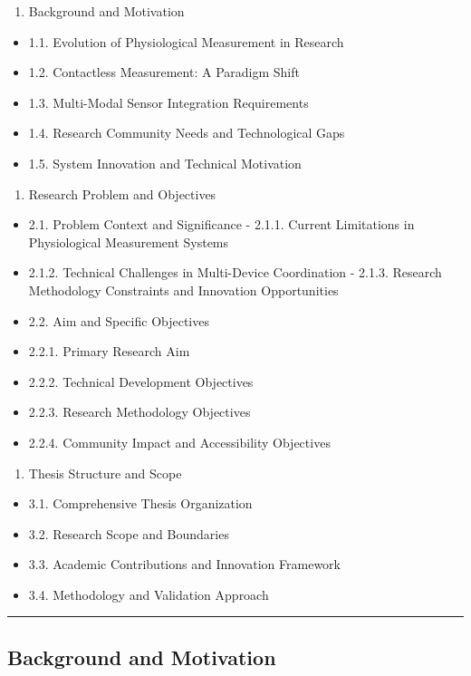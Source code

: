 \documentclass[12pt,a4paper]{report}
\begin{document}
\begin{enumerate}
\item Background and Motivation
\end{enumerate}
\begin{itemize}
\item 1.1. Evolution of Physiological Measurement in Research
\item 1.2. Contactless Measurement: A Paradigm Shift
\item 1.3. Multi-Modal Sensor Integration Requirements
\item 1.4. Research Community Needs and Technological Gaps
\item 1.5. System Innovation and Technical Motivation
\end{itemize}
\begin{enumerate}
\item Research Problem and Objectives
\end{enumerate}
\begin{itemize}
\item 2.1. Problem Context and Significance
        -
        2.1.1. Current Limitations in Physiological Measurement Systems
\item 2.1.2. Technical Challenges in Multi-Device Coordination
        -
        2.1.3. Research Methodology Constraints and Innovation Opportunities
\item 2.2. Aim and Specific Objectives
\item 2.2.1. Primary Research Aim
\item 2.2.2. Technical Development Objectives
\item 2.2.3. Research Methodology Objectives
\item 2.2.4. Community Impact and Accessibility Objectives
\end{itemize}
\begin{enumerate}
\item Thesis Structure and Scope
\end{enumerate}
\begin{itemize}
\item 3.1. Comprehensive Thesis Organization
\item 3.2. Research Scope and Boundaries
\item 3.3. Academic Contributions and Innovation Framework
\item 3.4. Methodology and Validation Approach

\end{itemize}
\hrule

\subsection{Background and Motivation}
\end{document}
